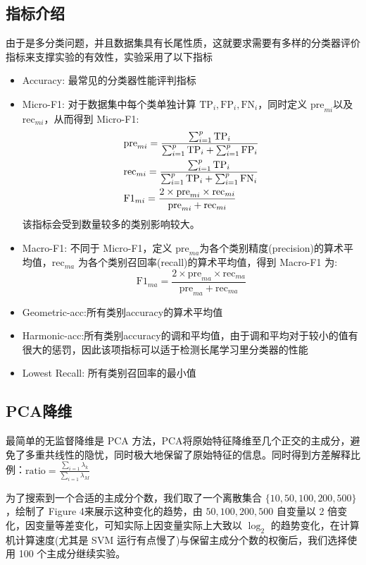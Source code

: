 \documentclass[fleqn]{Paquetes/RevDigMatEduInt}
\begin{document}
\subsection{指标介绍}
由于是多分类问题，并且数据集具有长尾性质，这就要求需要有多样的分类器评价指标来支撑实验的有效性，实验采用了以下指标
\begin{nota}
\begin{itemize}
	\item Accuracy: 最常见的分类器性能评判指标
	\item Micro-F1: 对于数据集中每个类单独计算 $\mathrm{TP}_i,\mathrm{FP}_i,\mathrm{FN}_i$，同时定义 $\mathrm{pre}_{mi}$以及$\mathrm{rec}_{mi}$，从而得到 Micro-F1:
	\begin{align}
		&\mathrm{pre}_{mi} = \frac{\sum_{i = 1}^p \mathrm{TP}_i}{\sum_{i = 1}^p \mathrm{TP}_i + \sum_{i = 1}^p \mathrm{FP}_i}\notag\\
		&\mathrm{rec}_{mi} = \frac{\sum_{i = 1}^p \mathrm{TP}_i}{\sum_{i = 1}^p \mathrm{TP}_i + \sum_{i = 1}^p \mathrm{FN}_i}\notag\\
		&\mathrm{F1}_{mi} = \frac{2\times \mathrm{pre}_{mi}\times \mathrm{rec}_{mi}}{\mathrm{pre}_{mi} + \mathrm{rec}_{mi}}\notag
	\end{align}
	该指标会受到数量较多的类别影响较大。
	\item Macro-F1: 不同于 Micro-F1，定义 $\mathrm{pre}_{ma}$为各个类别精度(precision)的算术平均值，$\mathrm{rec}_{ma}$ 为各个类别召回率(recall)的算术平均值，得到 Macro-F1 为:
	$$
	\mathrm{F1}_{ma} = \frac{2 \times \mathrm{pre}_{ma} \times \mathrm{rec}_{ma}}{\mathrm{pre}_{ma} + \mathrm{rec}_{ma}}
	$$
	\item Geometric-acc:所有类别accuracy的算术平均值
	\item Harmonic-acc:所有类别accuracy的调和平均值，由于调和平均对于较小的值有很大的惩罚，因此该项指标可以适于检测长尾学习里分类器的性能
	\item Lowest Recall: 所有类别召回率的最小值
\end{itemize}
\end{nota}
\subsection{PCA降维}
最简单的无监督降维是 PCA 方法，PCA将原始特征降维至几个正交的主成分，避免了多重共线性的隐忧，同时极大地保留了原始特征的信息。同时得到方差解释比例：$\mathrm{ratio}=\frac{\sum_{i=1}\lambda_{k}}{\sum_{i=1}\lambda_M}$

为了搜索到一个合适的主成分个数，我们取了一个离散集合 $\{10,50,100,200,500\}$，绘制了 Figure 4来展示这种变化的趋势，由 $50,100,200,500$ 自变量以 2 倍变化，因变量等差变化，可知实际上因变量实际上大致以 $\log_2$ 的趋势变化，在计算机计算速度(尤其是 SVM 运行有点慢了)与保留主成分个数的权衡后，我们选择使用 100 个主成分继续实验。
\end{document}
